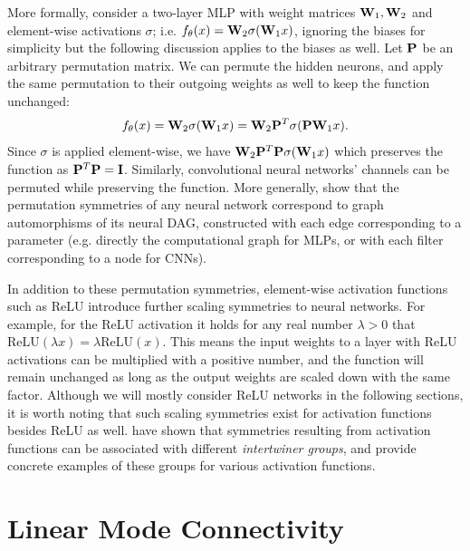 More formally, consider a two-layer MLP with weight matrices $\mathbf{W}_1, \mathbf{W}_2$ and element-wise activations $\sigma$; i.e. $f_\theta(x) = \mathbf{W}_2 \sigma (\mathbf{W}_1x)$, ignoring the biases for simplicity but the following discussion applies to the biases as well. Let $\mathbf{P}$ be an arbitrary permutation matrix. We can permute the hidden neurons, and apply the same permutation to their outgoing weights as well to keep the function unchanged:
\begin{equation}
    f_\theta(x) = \mathbf{W}_2 \sigma (\mathbf{W}_1x) = \mathbf{W}_2 \mathbf{P}^T \sigma (\mathbf{P} \mathbf{W}_1x).
\end{equation}
Since $\sigma$ is applied element-wise, we have $\mathbf{W}_2 \mathbf{P}^T  \mathbf{P} \sigma (\mathbf{W}_1x)$ which preserves the function as $\mathbf{P}^T  \mathbf{P} = \mathbf{I}$. Similarly, convolutional neural networks' channels can be permuted while preserving the function. More generally, \citet{limGraphMetanetworksProcessing2023} show that the permutation symmetries of any neural network correspond to graph automorphisms of its neural DAG, constructed with each edge corresponding to a parameter (e.g. directly the computational graph for MLPs, or with each filter corresponding to a node for CNNs).

In addition to these permutation symmetries, element-wise activation functions such as ReLU introduce further scaling symmetries to neural networks. For example, for the ReLU activation it holds for any real number $\lambda > 0$ that $\text{ReLU}(\lambda x) = \lambda \text{ReLU}(x)$. This means the input weights to a layer with ReLU activations can be multiplied with a positive number, and the function will remain unchanged as long as the output weights are scaled down with the same factor. Although we will mostly consider ReLU networks in the following sections, it is worth noting that such scaling symmetries exist for activation functions besides ReLU as well. \citep{godfreySymmetriesDeepLearning2022} have shown that symmetries resulting from activation functions can be associated with different \textit{intertwiner groups}, and provide concrete examples of these groups for various activation functions. 

\section{Linear Mode Connectivity}

